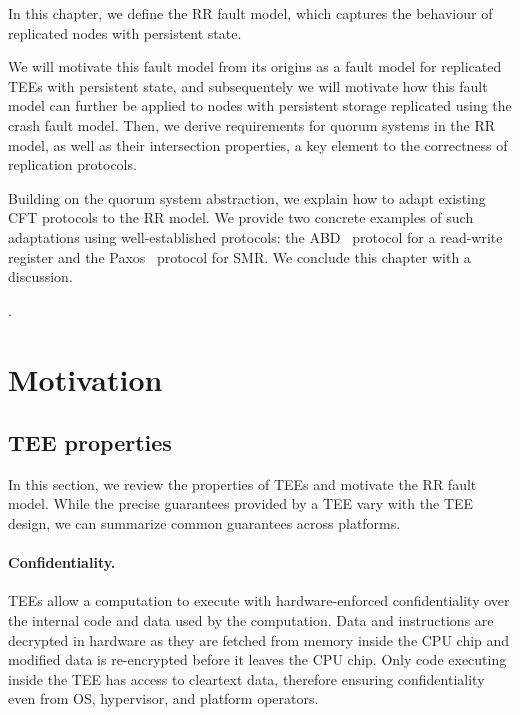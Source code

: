 \label{chap:model}
\cleardoublepage{}

In this chapter, we define the \ac{RR} fault model, which
captures the behaviour of replicated nodes with persistent state.

We will motivate this fault model from its origins as a fault model
for replicated \acp{TEE} with persistent state, and subsequentely
we will motivate how this fault model can further be applied to
nodes with persistent storage replicated using the crash fault
model. Then, we derive requirements for quorum systems in the
\ac{RR} model, as well as their intersection properties, a key element to the
correctness of replication protocols.

Building on the quorum system abstraction, we explain how to
adapt existing \ac{CFT} protocols to the \ac{RR} model. We
provide two concrete examples of such adaptations using
well-established protocols: the \ac{ABD}~\cite{abd} protocol for
a read-write register and the Paxos~\cite{paxos} protocol for
\ac{SMR}. We conclude this chapter with a discussion.

.

\section{Motivation}\label{sec:motivation}

\subsection{\ac{TEE} properties}\label{ssec:tee_motivation}

In this section, we review the properties of \acp{TEE} and motivate the
\ac{RR} fault model. While the precise guarantees provided by a
\ac{TEE} vary with the \ac{TEE} design, we can summarize common guarantees across platforms.

\paragraph{Confidentiality.} \acp{TEE} allow a computation to execute with
hardware-enforced confidentiality over the internal code and data used
by the computation. Data and instructions are decrypted in hardware as
they are fetched from memory inside the CPU chip and modified data is
re-encrypted before it leaves the CPU chip. Only code executing inside
the \ac{TEE} has access to cleartext data, therefore ensuring
confidentiality even from \ac{OS}, hypervisor, and platform
operators.

